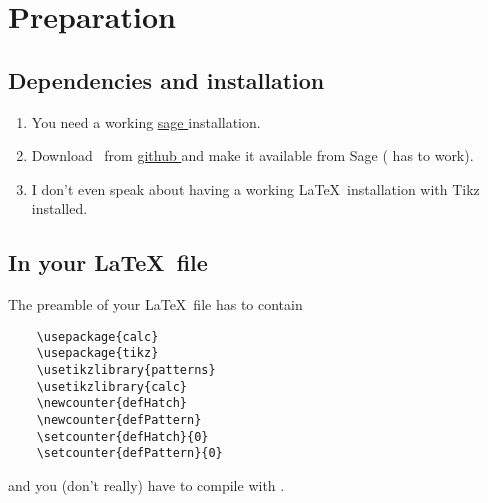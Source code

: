 \section{Preparation}

\subsection{Dependencies and installation}

\begin{enumerate}
    \item
        You need a working \href{ http://sagemath.org }{ sage } installation.
    \item
        Download \phystricks\ from \href{ https://github.com/LaurentClaessens/phystricks }{ github } and make it available from Sage ( has to work).
    \item
        I don't even speak about having a working \LaTeX\ installation with Tikz installed.
\end{enumerate}

\subsection{In your \LaTeX\ file}

The preamble of your \LaTeX\ file has to contain

\begin{verbatim}
    \usepackage{calc}   
    \usepackage{tikz}
    \usetikzlibrary{patterns}
    \usetikzlibrary{calc}
    \newcounter{defHatch}
    \newcounter{defPattern}
    \setcounter{defHatch}{0}
    \setcounter{defPattern}{0}
\end{verbatim}

and you (don't really) have to compile with .

